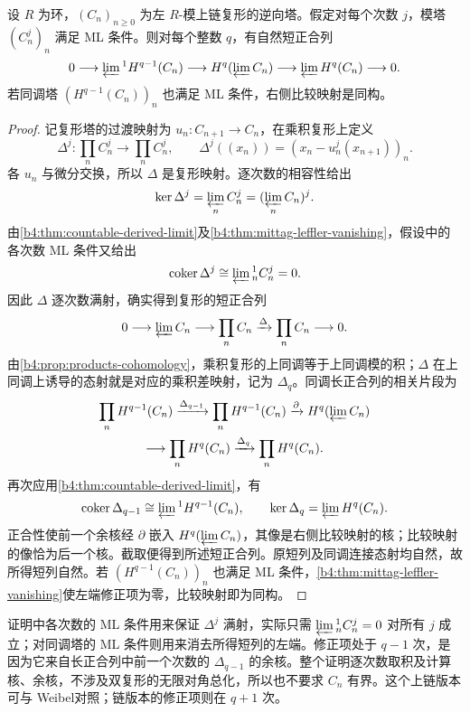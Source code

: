 \begin{theorem}\label{b4:thm:milnor-exact-sequence}
	设 \(R\) 为环，\((C_n)_{n\ge0}\) 为左 \(R\)-模上链复形的逆向塔。假定对每个次数 \(j\)，模塔 \((C_n^j)_n\) 满足 ML 条件。则对每个整数 \(q\)，有自然短正合列
	\[
		0\longrightarrow\varprojlim{}^1 H^{q-1}(C_n) \longrightarrow H^q(\varprojlim C_n) \longrightarrow\varprojlim H^q(C_n)\longrightarrow0.
	\]
	若同调塔 \((H^{q-1}(C_n))_n\) 也满足 ML 条件，右侧比较映射是同构。
\end{theorem}
\begin{proof}
	记复形塔的过渡映射为 \(u_n:C_{n+1}\to C_n\)，在乘积复形上定义
	\[
		\Delta^j:\prod_n C_n^j\longrightarrow\prod_n C_n^j, \qquad \Delta^j((x_n))=(x_n-u_n^j(x_{n+1}))_n.
	\]
	各 \(u_n\) 与微分交换，所以 \(\Delta\) 是复形映射。逐次数的相容性给出
	\[
		\ker\Delta^j=\varprojlim_n C_n^j =(\varprojlim_n C_n)^j.
	\]
	由\cref{b4:thm:countable-derived-limit}及\cref{b4:thm:mittag-leffler-vanishing}，假设中的各次数 ML 条件又给出
	\[
		\operatorname{coker}\Delta^j \cong\varprojlim{}^1_n C_n^j=0.
	\]
	因此 \(\Delta\) 逐次数满射，确实得到复形的短正合列
	\[
		0\longrightarrow\varprojlim C_n\longrightarrow\prod_n C_n \xrightarrow{\Delta}\prod_n C_n\longrightarrow0.
	\]
	由\cref{b4:prop:products-cohomology}，乘积复形的上同调等于上同调模的积；\(\Delta\) 在上同调上诱导的态射就是对应的乘积差映射，记为 \(\Delta_q\)。同调长正合列的相关片段为
	\[
		\begin{gathered}
			\prod_n H^{q-1}(C_n) \xrightarrow{\Delta_{q-1}}\prod_n H^{q-1}(C_n) \xrightarrow{\partial}H^q(\varprojlim C_n)\\
			\longrightarrow\prod_n H^q(C_n) \xrightarrow{\Delta_q}\prod_n H^q(C_n).
		\end{gathered}
	\]
	再次应用\cref{b4:thm:countable-derived-limit}，有
	\[
		\operatorname{coker}\Delta_{q-1} \cong\varprojlim{}^1 H^{q-1}(C_n), \qquad \ker\Delta_q=\varprojlim H^q(C_n).
	\]
	正合性使前一个余核经 \(\partial\) 嵌入 \(H^q(\varprojlim C_n)\)，其像是右侧比较映射的核；比较映射的像恰为后一个核。截取便得到所述短正合列。原短列及同调连接态射均自然，故所得短列自然。若 \((H^{q-1}(C_n))_n\) 也满足 ML 条件，\cref{b4:thm:mittag-leffler-vanishing}使左端修正项为零，比较映射即为同构。
\end{proof}

证明中各次数的 ML 条件用来保证 \(\Delta^j\) 满射，实际只需 \(\varprojlim{}^1_n C_n^j=0\) 对所有 \(j\) 成立；对同调塔的 ML 条件则用来消去所得短列的左端。修正项处于 \(q-1\) 次，是因为它来自长正合列中前一个次数的 \(\Delta_{q-1}\) 的余核。整个证明逐次数取积及计算核、余核，不涉及双复形的无限对角总化，所以也不要求 \(C_n\) 有界。这个上链版本可与 Weibel\cite[Theorem 3.5.8, Variant]{Weibel1994HomologicalAlgebra}对照；链版本的修正项则在 \(q+1\) 次。


